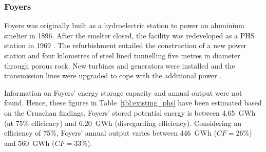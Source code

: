 \subsubsection{Foyers}

Foyers was originally built as a hydroelectric station to power an aluminium smelter in 1896.
After the smelter closed, the facility was redeveloped as a PHS station in 1969 \citep{ScotsRenewables2011, Strathclyde2004}.
The refurbishment entailed the construction of a new power station and four kilometres of steel lined tunnelling five metres in diameter through porous rock.
New turbines and generators were installed and the transmission lines were upgraded to cope with the additional power \citep{Strathclyde2004}.

Information on Foyers' energy storage capacity and annual output were not found.
Hence, these figures in Table~\ref{tbl:existing_phs} have been estimated based on the Cruachan findings.
Foyers' stored potential energy is between 4.65~GWh (at 75\% efficiency) and 6.20~GWh (disregarding efficiency).
Considering an efficiency of 75\%, Foyers' annual output varies between 446~GWh ($CF = 26\%$) and 560~GWh ($CF = 33\%$).

